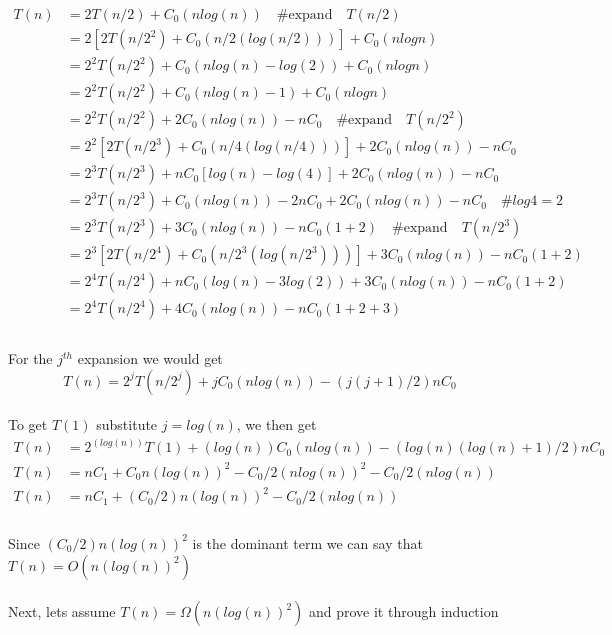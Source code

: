 \documentclass[12pt]{article}
\begin{document}
\begin{equation}
\begin{aligned}
\nonumber
T(n)&=2T(n/2)+C_0(nlog(n)) \quad \text{\# expand} \quad T(n/2) \\
&=2[2T(n/2^2)+C_0(n/2(log(n/2))) ] + C_0(nlogn) \\
&=2^2T(n/2^2)+C_0(nlog(n)-log(2)) + C_0(nlogn) \\
&=2^2T(n/2^2)+C_0(nlog(n)-1) + C_0(nlogn) \\
&=2^2T(n/2^2)+2C_0(nlog(n)) -nC_0  \quad \text{\# expand} \quad T(n/2^2) \\
&=2^2[2T(n/2^3)+C_0(n/4(log(n/4)))] +2C_0(nlog(n)) -nC_0 \\
&=2^3T(n/2^3) + nC_0[log(n) - log(4)] +2C_0(nlog(n)) -nC_0 \\
&=2^3T(n/2^3) + C_0(nlog(n)) - 2nC_0 +2C_0(nlog(n)) -nC_0 \quad \text{\# \(log4=2\) }  \\
&=2^3T(n/2^3) + 3C_0(nlog(n)) - nC_0(1+2) \quad \text{\# expand} \quad T(n/2^3) \\
&=2^3[2T(n/2^4)+C_0(n/2^3(log(n/2^3)))] +3C_0(nlog(n)) -nC_0(1+2) \\
&=2^4T(n/2^4)+nC_0(log(n)-3log(2)) +3C_0(nlog(n)) -nC_0(1+2) \\
&=2^4T(n/2^4)+4C_0(nlog(n)) - nC_0(1+2+3) \\
\end{aligned}
\end{equation}
\\
For the \(j^{th}\) expansion we would get 
\begin{equation}
\nonumber
T(n)=2^jT(n/2^j) + jC_0(nlog(n)) - (j(j+1)/2)nC_0
\end{equation}
\\
To get \(T(1)\) substitute \(j=log(n)\), we then get
\begin{equation}
\begin{aligned}
\nonumber
T(n)&=2^{(log(n))}T(1) + (log(n))C_0(nlog(n)) - (log(n)(log(n)+1)/2)nC_0 \\
T(n)&=nC_1+C_0n(log(n))^2-C_0/2(nlog(n))^2 - C_0/2(nlog(n)) \\
T(n)&=nC_1+(C_0/2)n(log(n))^2 - C_0/2(nlog(n)) \\
\end{aligned}
\end{equation}
\\
Since \((C_0/2)n(log(n))^2\) is the dominant term we can say that  \(T(n)=O(n(log(n))^2)\)
\\ \\
Next, lets assume \(T(n)=\Omega(n(log(n))^2)\) and prove it through induction \\
\end{document}
